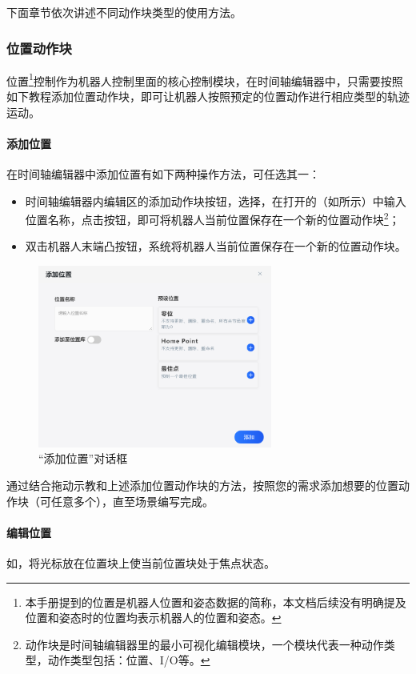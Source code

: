 下面章节依次讲述不同动作块类型的使用方法。

\subsubsection{位置动作块}
位置\footnote{本手册提到的位置是机器人位置和姿态数据的简称，本文档后续没有明确提及位置和姿态时的位置均表示机器人的位置和姿态。}控制作为机器人控制里面的核心控制模块，在时间轴编辑器中，只需要按照如下教程添加位置动作块，即可让机器人按照预定的位置动作进行相应类型的轨迹运动。
\paragraph{添加位置}
在时间轴编辑器中添加位置有如下两种操作方法，可任选其一：
\begin{itemize}
	\item 时间轴编辑器内编辑区的添加动作块按钮，选择，在打开的（如所示）中输入位置名称，点击按钮，即可将机器人当前位置保存在一个新的位置动作块\footnote{动作块是时间轴编辑器里的最小可视化编辑模块，一个模块代表一种动作类型，动作类型包括：位置、I/O等。}；
	\item 双击机器人末端凸按钮，系统将机器人当前位置保存在一个新的位置动作块。
\end{itemize}

\begin{figure}[ht]
	\centering
	\includegraphics[height=6cm]{screen/3-6.png}
	\caption{“添加位置”对话框}
	\label{fig:添加位置对话框}
\end{figure}

通过结合拖动示教和上述添加位置动作块的方法，按照您的需求添加想要的位置动作块（可任意多个），直至场景编写完成。

\paragraph{编辑位置}
\label{sec:编辑位置}
如，将光标放在位置块上使当前位置块处于焦点状态。

